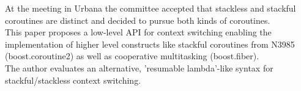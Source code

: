 At the meeting in Urbana the committee accepted that stackless and stackful
coroutines are distinct and decided to pursue both kinds of coroutines.\\
This paper proposes a low-level API for context switching enabling the
implementation of higher level constructs like stackful coroutines from N3985
(boost.coroutine2\cite{bcoroutine2}) as well as cooperative multitasking
(boost.fiber\cite{bfiber}).\\
The author evaluates an alternative, 'resumable lambda'-like syntax for
stackful/stackless context switching.
